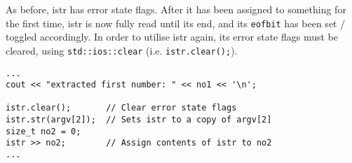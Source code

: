 As before, istr has error state flags. After it has been assigned to something for the first time, istr is now fully read until its end, and its \texttt{eofbit} has been set / toggled accordingly. In order to utilise istr again, its error state flags must be cleared, using \texttt{std::ios::clear} (i.e. \texttt{istr.clear();}).

\begin{lstlisting}[style=inline]
...
cout << "extracted first number: " << no1 << '\n';

istr.clear();       // Clear error state flags
istr.str(argv[2]);  // Sets istr to a copy of argv[2]
size_t no2 = 0;
istr >> no2;        // Assign contents of istr to no2
...
\end{lstlisting}
